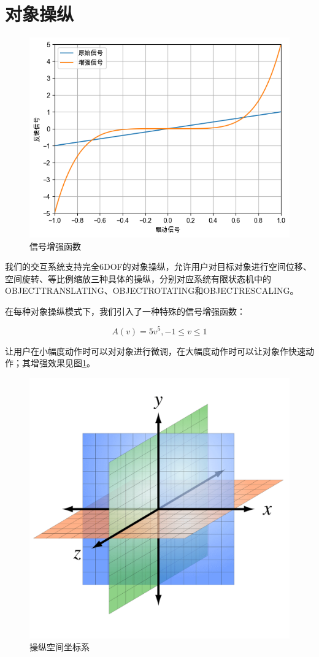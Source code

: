 \section{对象操纵}\label{Manipulation}

\begin{figure}[b!]
    \centering
    \includegraphics[width=.7\textwidth]{figure/augmented.png}
    \caption{信号增强函数}
    \label{fig-3-2}
\end{figure}

我们的交互系统支持完全6DOF的对象操纵，允许用户对目标对象进行空间位移、空间旋转、等比例缩放三种具体的操纵，分别对应系统有限状态机中的OBJECT\us TRANSLATING、OBJECT\us ROTATING和OBJECT\us RESCALING。

在每种对象操纵模式下，我们引入了一种特殊的信号增强函数：

\begin{equation}
	\label{formula-3-1}
	A(v) = 5v^{5}, -1 \le v \le 1
\end{equation}

让用户在小幅度动作时可以对对象进行微调，在大幅度动作时可以让对象作快速动作；其增强效果见图\ref{fig-3-2}。


\begin{figure}[t!]
    \centering
    \includegraphics[width=.4\textwidth]{figure/coordinate.png}
    \caption{操纵空间坐标系}
    \label{fig-3-3}
\end{figure}

